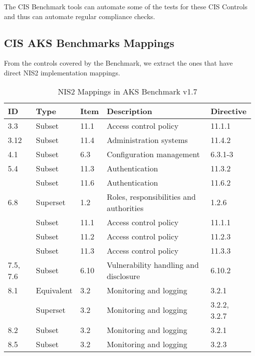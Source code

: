 \pagebreak

The CIS Benchmark tools can automate some of the tests for these CIS Controls and thus can automate regular compliance checks.

\subsection{CIS AKS Benchmarks Mappings}

From the controls covered by the Benchmark, we extract the ones that have direct NIS2 implementation mappings.

\begin{table}[ht]
  \caption{NIS2 Mappings in AKS Benchmark v1.7}
    \begin{tabular}{| l | l | l | l | l |}
    \hline
    ID & Type & Item & Description & Directive \\
    \hline\hline
    3.3 & Subset & 11.1 & Access control policy & 11.1.1 \\
    \hline
    3.12 & Subset & 11.4 & Administration systems & 11.4.2 \\
    \hline
    4.1 & Subset & 6.3 & Configuration management & 6.3.1-3 \\
    \hline
    5.4 & Subset & 11.3 & Authentication & 11.3.2 \\
    \hline
    & Subset & 11.6 & Authentication & 11.6.2 \\
    \hline
    6.8 & Superset & 1.2 & Roles, responsibilities and authorities & 1.2.6 \\
    \hline
    & Subset & 11.1 & Access control policy & 11.1.1 \\
    \hline
    & Subset & 11.2 & Access control policy & 11.2.3 \\
    \hline
    & Subset & 11.3 & Access control policy & 11.3.3 \\
    \hline
    7.5, 7.6 & Subset & 6.10 & Vulnerability handling and disclosure & 6.10.2 \\
    \hline
    8.1 & Equivalent & 3.2 & Monitoring and logging & 3.2.1 \\
    \hline
    & Superset & 3.2 & Monitoring and logging & 3.2.2, 3.2.7 \\
    \hline
    8.2 & Subset & 3.2 & Monitoring and logging & 3.2.1 \\
    \hline
    8.5 & Subset & 3.2 & Monitoring and logging & 3.2.3 \\
    \hline
    \end{tabular}%
  \label{tab:aksMapping}%
\end{table}%

